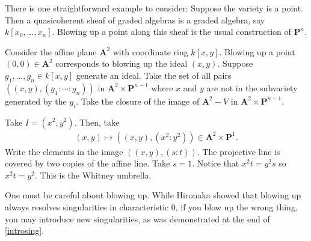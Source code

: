 \documentclass [11 pt, oneside, margin = 1 in] {article}
\begin{document}
There is one straightforward example to consider: Suppose the variety is a point. Then a quasicoherent sheaf of graded algebras is a graded algebra, say $k[x_0,\hdots,x_n]$. Blowing up a point along this sheaf is the usual construction of $\mathbf{P}^n$.

\begin{example}[ ]\label{introsing}\text{}
Consider the affine plane $\mathbf{A}^2$ with coordinate ring $k[x,y]$. Blowing up a point $(0,0)\in  \mathbf{A}^2$ corresponds to blowing up the ideal $(x,y)$. Suppose $g_1,\hdots, g_n\in k[x,y]$ generate an ideal. Take the set of all pairs $((x,y), (g_1:\cdots:g_n))$ in $\mathbf{A}^2\times \mathbf{P}^{n-1}$ where $x$ and $y$ are not in the subvariety generated by the $g_i$. Take the closure of the image of $\mathbf{A}^2- V$ in $\mathbf{A}^2\times \mathbf{P}^{n-1}$.

Take $I=(x^2,y^2)$. Then, take 
\begin{align*}
	(x,y)\longmapsto  ((x,y), (x^2:y^2)) \in \mathbf{A}^2\times \mathbf{P}^1.
\end{align*}
Write the elements in the image $((x,y),  (s:t))$. The projective line is covered by two copies of the affine line. Take $s=1$. Notice that $x^2t = y^2s$ so $x^2t=y^2$. This is the Whitney umbrella.
\end{example}

\begin{warn}
	One must be careful about blowing up. While Hironaka showed that blowing up always resolves singularities in characteristic $0$, if you blow up the wrong thing, you may introduce new singularities, as was demonstrated at the end of \cref{introsing}.
\end{warn}
\end{document}
